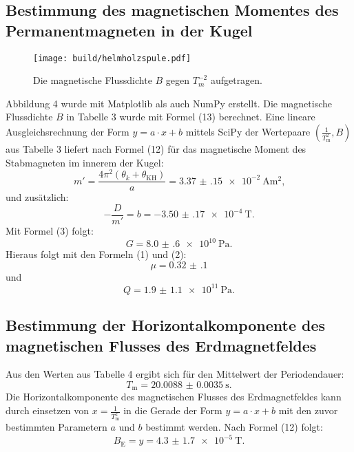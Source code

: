 \subsection{Bestimmung des magnetischen Momentes des Permanentmagneten in der Kugel}
\begin{figure}[H]
	\centering
	\caption{Die magnetische Flussdichte $B$ gegen $T_m ^{-2}$ aufgetragen.}
	\texttt{[image: build/helmholzspule.pdf]}
	\label{fig:grad3}
\end{figure}

Abbildung 4 wurde mit Matplotlib \cite{matplotlib} als auch NumPy \cite{numpy} erstellt.
Die magnetische Flussdichte $B$ in Tabelle 3 wurde mit Formel (13) berechnet.
Eine lineare Ausgleichsrechnung der Form $y = a \cdot x + b$ mittels SciPy \cite{scipy} der Wertepaare $\left(\frac{1}{T_\text{m}^2}, B\right)$ aus Tabelle 3 liefert nach Formel (12) für das magnetische Moment des Stabmagneten im innerem der Kugel:
\begin{displaymath}
	m' = \frac{4 \pi ^2 (\theta_k + \theta_{\text{KH}})}{a} = \SI{3.37(15)e-2}{\ampere\meter\squared}\text{,}
\end{displaymath}
und zusätzlich:
\begin{displaymath} 
	-\frac{D}{m'} = b =  \SI{-3.50(17)e-4}{\tesla}\text{.}
\end{displaymath}
Mit Formel (3) folgt:
\begin{displaymath} 
	G =  \SI{8.0(6)e10}{\pascal}\text{.}
\end{displaymath}
Hieraus folgt mit den Formeln (1) und (2):
\begin{displaymath}
	\mu = \num{0.32(10)}
\end{displaymath}
und
\begin{displaymath} 
	Q =  \SI{1.9(11)e11}{\pascal}\text{.}
\end{displaymath}






\subsection{Bestimmung der Horizontalkomponente des magnetischen Flusses des Erdmagnetfeldes}

Aus den Werten aus Tabelle 4 ergibt sich für den Mittelwert der Periodendauer:
\begin{displaymath}
	T_\text{m} = \SI{20.0088(35)}{\second}\text{.}
\end{displaymath}
Die Horizontalkomponente des magnetischen Flusses des Erdmagnetfeldes kann durch einsetzen von $x=\frac{1}{T_\text{m}^2}$ in die Gerade der Form $y = a \cdot x +b$ mit den zuvor bestimmten Parametern $a$ und $b$ bestimmt werden. Nach Formel (12) folgt:
\begin{displaymath}
	B_\text{E} = y = \SI{ 4.3(17)e-5}{\tesla}\text{.}
\end{displaymath}


